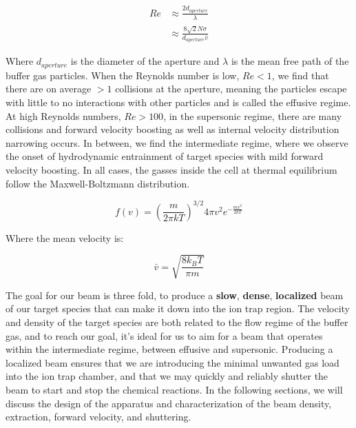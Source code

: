 \begin{align}
	Re & \approx \frac{2 d_{aperture}}{\lambda} \nonumber \\
	& \approx \frac{8\sqrt{2} \dot{N} \sigma}{d_{aperture} \bar{v}} \label{eq: reynolds}
\end{align}

Where $d_{aperture}$ is the diameter of the aperture and $\lambda$ is the mean free path of the buffer gas particles.\cite{Hutzler2012} When the Reynolds number is low, $Re<1$, we find that there are on average $>1$ collisions at the aperture, meaning the particles escape with little to no interactions with other particles and is called the effusive regime. At high Reynolds numbers, $Re>100$, in the supersonic regime, there are many collisions and forward velocity boosting as well as internal velocity distribution narrowing occurs. In between, we find the intermediate regime, where we observe the onset of hydrodynamic entrainment of target species with mild forward velocity boosting. In all cases, the gasses inside the cell at thermal equilibrium follow the Maxwell-Boltzmann distribution.

\begin{equation}
	f(v) = \left(\frac{m}{2 \pi k T}\right)^{3/2}4 \pi v^2 e^{-\frac{m v^2}{2 k T}}
	\label{eq: mb_distribution}
\end{equation}

Where the mean velocity is:

\begin{equation}
	\bar{v} = \sqrt{\frac{8 k_B T}{\pi m}}
	\label{eq: mb_mean}
\end{equation}

The goal for our beam is three fold, to produce a \textbf{slow}, \textbf{dense}, \textbf{localized} beam of our target species that can make it down into the ion trap region. The velocity and density of the target species are both related to the flow regime of the buffer gas, and to reach our goal, it's ideal for us to aim for a beam that operates within the intermediate regime, between effusive and supersonic. Producing a localized beam ensures that we are introducing the minimal unwanted gas load into the ion trap chamber, and that we may quickly and reliably shutter the beam to start and stop the chemical reactions. In the following sections, we will discuss the design of the apparatus and characterization of the beam density, extraction, forward velocity, and shuttering.